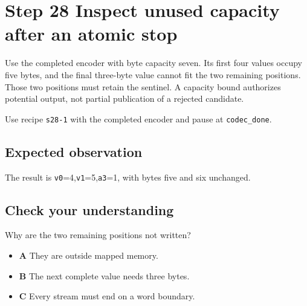 \section{Step 28 Inspect unused capacity after an atomic stop}\label{delta-s28}

Use the completed encoder with byte capacity seven. Its first four values occupy five bytes, and the final three-byte value cannot fit the two remaining positions. Those two positions must retain the sentinel. A capacity bound authorizes potential output, not partial publication of a rejected candidate.

Use recipe \texttt{s28-1} with the completed encoder and pause at \texttt{codec\_done}.

\subsection{Expected observation}
The result is \texttt{v0}=4,\texttt{v1}=5,\texttt{a3}=1, with bytes five and six unchanged.

\subsection{Check your understanding}
Why are the two remaining positions not written?

\begin{itemize}
\item \textbf{A} They are outside mapped memory.
\item \textbf{B} The next complete value needs three bytes.
\item \textbf{C} Every stream must end on a word boundary.
\end{itemize}
